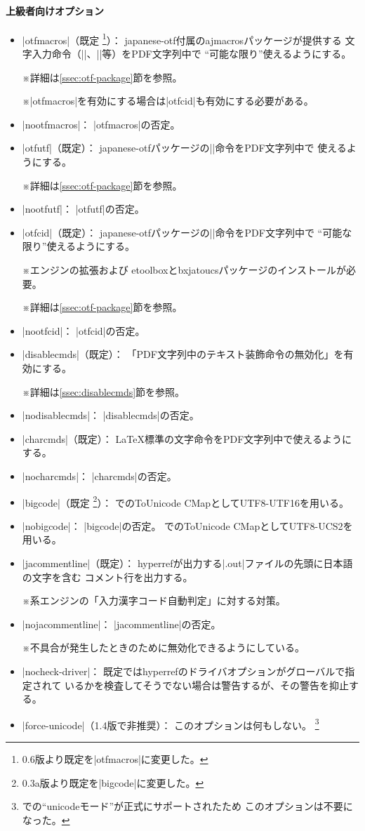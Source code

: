 \documentclass[uplatex,dvipdfmx,a4paper]{jsarticle}
\renewcommand{\headfont}{\gtfamily\romanseries{sbc}\sffamily}
\newcommand{\Pkg}[1]{\textsf{#1}}
\newcommand{\Note}{\par\noindent ※}
\newcommand{\Means}{：\quad}
\newcommand{\／}{\mbox{}／\mbox{}}
\providecommand{\Strong}[1]{{\headfont#1}}
\begin{document}
\paragraph{上級者向けオプション}\mbox{}
\begin{itemize}
\item |otfmacros|（既定
  \footnote{0.6版より既定を|otfmacros|に変更した。}）\Means
  \Pkg{japanese-otf}付属の\Pkg{ajmacros}パッケージが提供する
  文字入力命令（|\ajMaru|、|\ajLig|等）をPDF文字列中で
  “可能な限り”使えるようにする。
  \Note 詳細は\ref{ssec:otf-package}節を参照。
  \Note |otfmacros|を有効にする場合は|otfcid|も有効にする必要がある。
\item |nootfmacros|\Means
  |otfmacros|の否定。
\item |otfutf|（既定）\Means
  \Pkg{japanese-otf}パッケージの|\UTF|命令をPDF文字列中で
  使えるようにする。
  \Note 詳細は\ref{ssec:otf-package}節を参照。
\item |nootfutf|\Means
  |otfutf|の否定。
\item |otfcid|（既定）\Means
  \Pkg{japanese-otf}パッケージの|\CID|命令をPDF文字列中で
  “可能な限り”使えるようにする。
  \Note エンジンの{\eTeX}拡張および
  \Pkg{etoolbox}と\Pkg{bxjatoucs}パッケージのインストールが必要。
  \Note 詳細は\ref{ssec:otf-package}節を参照。
\item |nootfcid|\Means
  |otfcid|の否定。
\item |disablecmds|（既定）\Means
  「PDF文字列中のテキスト装飾命令の無効化」を有効にする。
  \Note 詳細は\ref{ssec:disablecmds}節を参照。
\item |nodisablecmds|\Means
  |disablecmds|の否定。
\item |charcmds|（既定）\Means
  {\LaTeX}標準の文字命令をPDF文字列中で使えるようにする。
\item |nocharcmds|\Means
  |charcmds|の否定。
\item |bigcode|（既定
  \footnote{0.3a版より既定を|bigcode|に変更した。}）\Means
  {\upTeX}でのToUnicode CMapとしてUTF8-UTF16を用いる。
\item |nobigcode|\Means
  |bigcode|の否定。
  {\upTeX}でのToUnicode CMapとしてUTF8-UCS2を用いる。
\item |jacommentline|（既定）\Means
  \Pkg{hyperref}が出力する|.out|ファイルの先頭に日本語の文字を含む
  コメント行を出力する。
  \Note {\pTeX}系エンジンの「入力漢字コード自動判定」に対する対策。
\item |nojacommentline|\Means
  |jacommentline|の否定。
  \Note 不具合が発生したときのために無効化できるようにしている。
\item |nocheck-driver|\Means
  既定では\Pkg{hyperref}のドライバオプションがグローバルで指定されて
  いるかを検査してそうでない場合は警告するが、その警告を抑止する。
\item |force-unicode|（1.4版で\Strong{非推奨}）\Means
  このオプションは何もしない。
  \footnote{{\pLaTeX}での“unicodeモード”が正式にサポートされたため
    このオプションは不要になった。}
\end{itemize}
\end{document}
